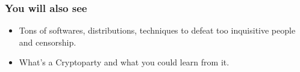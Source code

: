 \begin{frame}
\frametitle{You will also see}
\begin{itemize}
\item Tons of softwares, distributions, techniques to defeat too inquisitive
people and censorship.
\item What's a Cryptoparty and what you could learn from it.
\end{itemize}
\end{frame}

